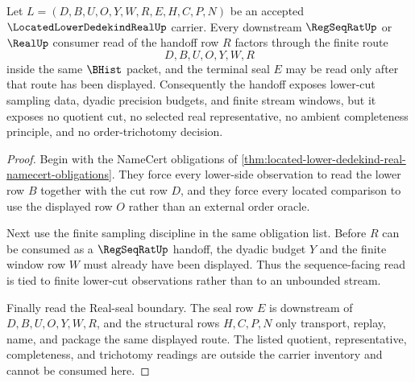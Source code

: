 \begin{theorem}
\label{thm:located-lower-dedekind-real-regseqrat-handoff}
Let $L=(D,B,U,O,Y,W,R,E,H,C,P,N)$ be an accepted $\LocatedLowerDedekindRealUp$ carrier. Every downstream $\RegSeqRatUp$ or $\RealUp$ consumer read of the handoff row $R$ factors through the finite route
$$
D,B,U,O,Y,W,R
$$
inside the same $\BHist$ packet, and the terminal seal $E$ may be read only after that route has been displayed. Consequently the handoff exposes lower-cut sampling data, dyadic precision budgets, and finite stream windows, but it exposes no quotient cut, no selected real representative, no ambient completeness principle, and no order-trichotomy decision.
\end{theorem}
\begin{proof}
Begin with the NameCert obligations of \autoref{thm:located-lower-dedekind-real-namecert-obligations}. They force every lower-side observation to read the lower row $B$ together with the cut row $D$, and they force every located comparison to use the displayed row $O$ rather than an external order oracle.

Next use the finite sampling discipline in the same obligation list. Before $R$ can be consumed as a $\RegSeqRatUp$ handoff, the dyadic budget $Y$ and the finite window row $W$ must already have been displayed. Thus the sequence-facing read is tied to finite lower-cut observations rather than to an unbounded stream.

Finally read the Real-seal boundary. The seal row $E$ is downstream of $D,B,U,O,Y,W,R$, and the structural rows $H,C,P,N$ only transport, replay, name, and package the same displayed route. The listed quotient, representative, completeness, and trichotomy readings are outside the carrier inventory and cannot be consumed here.
\end{proof}


\begin{closurestatus}{\LocatedLowerDedekindRealUp}
  \theoryclosure{\seedClosure}
  \formalstatus{\unformalizedV}
\end{closurestatus}
